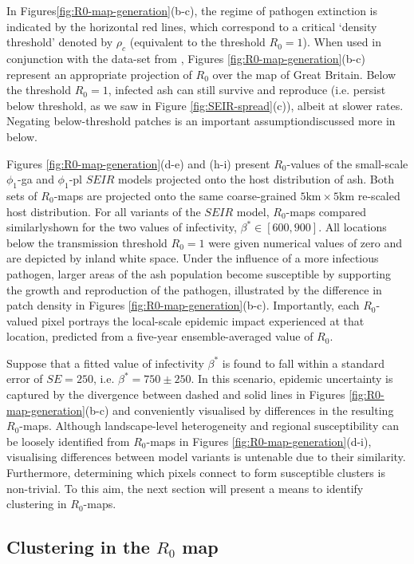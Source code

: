 In Figures\ref{fig:R0-map-generation}(b-c), the regime of pathogen extinction is indicated by the horizontal red lines, 
which correspond to a critical `density threshold' denoted by $\rho_c$ (equivalent to the threshold $R_0 = 1$).
When used in conjunction with the data-set from \cite{hill.data}, Figures \ref{fig:R0-map-generation}(b-c) represent an appropriate projection of $R_0$ over the map of Great Britain.
Below the threshold $R_0=1$, infected ash can still survive and reproduce (i.e. persist below threshold, as we saw in Figure \ref{fig:SEIR-spread}(c)), albeit at slower rates.
Negating below-threshold patches is an important assumption\textemdash discussed more in below.

Figures \ref{fig:R0-map-generation}(d-e) and (h-i) present $R_0$-values of the small-scale $\phi_1$-ga and $\phi_1$-pl $SEIR$ models projected onto the host distribution of ash.
Both sets of $R_0$-maps are projected onto the same coarse-grained $5\mathrm{km} \times 5\mathrm{km}$ re-scaled host distribution.
For all variants of the $SEIR$ model, $R_0$-maps compared similarly\textemdash shown for the two values of infectivity, $\beta^* \in [600, 900]$.
All locations below the transmission threshold $R_0=1$ were given numerical values of zero and are depicted by inland white space.
Under the influence of a more infectious pathogen, larger areas of the ash population become susceptible by supporting the growth and reproduction of the pathogen, illustrated by the difference in patch density in Figures \ref{fig:R0-map-generation}(b-c). 
Importantly, each $R_0$-valued pixel portrays the local-scale epidemic impact experienced at that location, predicted from a five-year ensemble-averaged value of $R_0$.

Suppose that a fitted value of infectivity $\beta^*$ is found to fall within a standard error of $SE=250$,  i.e. $\beta^* = 750 \pm 250$.
In this scenario, epidemic uncertainty is captured by the divergence between dashed and solid lines in Figures \ref{fig:R0-map-generation}(b-c)
and conveniently visualised by differences in the resulting $R_0$-maps.
Although landscape-level heterogeneity and regional susceptibility can be loosely identified from $R_0$-maps in Figures \ref{fig:R0-map-generation}(d-i),
visualising differences between model variants is untenable due to their similarity. 
Furthermore, determining which pixels connect to form susceptible clusters is non-trivial. 
To this aim, the next section will present a means to identify clustering in $R_0$-maps.

\subsection{Clustering in the $R_0$ map}
\label{sec:r0-clustering}

